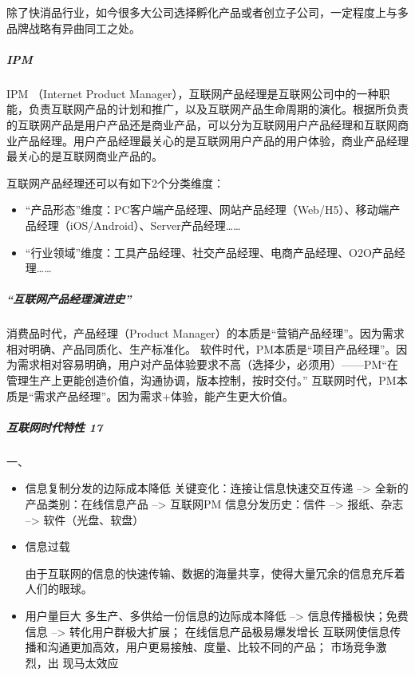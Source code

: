 \documentclass[letterpaper,10pt,english]{sphinxmanual}
\begin{document}
除了快消品行业，如今很多大公司选择孵化产品或者创立子公司，一定程度上与多品牌战略有异曲同工之处。


\subparagraph{IPM}
\label{\detokenize{chapter_introduction/AI_PM:ipm}}
IPM （Internet Product
Manager），互联网产品经理是互联网公司中的一种职能，负责互联网产品的计划和推广，以及互联网产品生命周期的演化。根据所负责的互联网产品是用户产品还是商业产品，可以分为互联网用户产品经理和互联网商业产品经理。用户产品经理最关心的是互联网用户产品的用户体验，商业产品经理最关心的是互联网商业产品的。

互联网产品经理还可以有如下2个分类维度：
\begin{itemize}
\item {} 
“产品形态”维度：PC客户端产品经理、网站产品经理（Web/H5）、移动端产品经理（iOS/Android）、Server产品经理……

\item {} 
“行业领域”维度：工具产品经理、社交产品经理、电商产品经理、O2O产品经理……

\end{itemize}


\subparagraph{“互联网产品经理演进史”}
\label{\detokenize{chapter_introduction/AI_PM:id2}}
消费品时代，产品经理（Product
Manager）的本质是“营销产品经理”。因为需求相对明确、产品同质化、生产标准化。
软件时代，PM本质是“项目产品经理”。因为需求相对容易明确，用户对产品体验要求不高（选择少，必须用）——PM“在管理生产上更能创造价值，沟通协调，版本控制，按时交付。”
互联网时代，PM本质是“需求产品经理”。因为需求+体验，能产生更大价值。


\subparagraph{互联网时代特性 17\sphinxfootnotemark[261]}
\label{\detokenize{chapter_introduction/AI_PM:id3}}%
\begin{footnotetext}[261]\sphinxAtStartFootnote
{}
%
\end{footnotetext}\ignorespaces 
一、
\begin{itemize}
\item {} 
信息复制分发的边际成本降低  关键变化：连接让信息快速交互传递 –>
全新的产品类别：在线信息产品 –> 互联网PM 信息分发历史：信件 –>
报纸、杂志 –> 软件（光盘、软盘）

\item {} 
信息过载
%
\begin{footnote}[262]\sphinxAtStartFootnote
{}
%
\end{footnote}
由于互联网的信息的快速传输、数据的海量共享，使得大量冗余的信息充斥着人们的眼球。

\item {} 
用户量巨大 多生产、多供给一份信息的边际成本降低 –>
信息传播极快；免费信息 –> 转化用户群极大扩展； 
在线信息产品极易爆发增长
互联网使信息传播和沟通更加高效，用户更易接触、度量、比较不同的产品；
市场竞争激烈，出 现马太效应

\end{itemize}
\end{document}
